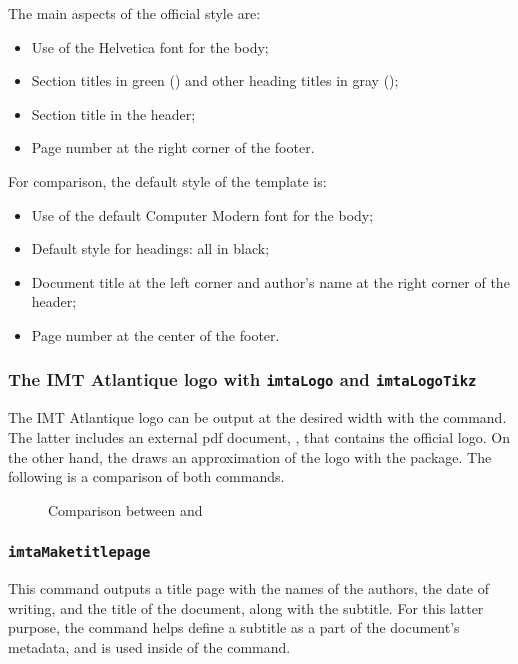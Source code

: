 \documentclass{article}
\begin{document}
The main aspects of the official style are:

\begin{itemize}
    \item Use of the Helvetica font for the body;
    \item Section titles in green () and other heading titles in gray ();
    \item Section title in the header;
    \item Page number at the right corner of the footer.
\end{itemize}

For comparison, the default style of the template is:

\begin{itemize}
    \item Use of the default Computer Modern font for the body;
    \item Default style for headings: all in black;
    \item Document title at the left corner and author's name at the right corner of the header;
    \item Page number at the center of the footer.
\end{itemize}

\subsubsection{The IMT Atlantique logo with \texttt{imtaLogo} and \texttt{imtaLogoTikz}}
The IMT Atlantique logo can be output at the desired width with the  command.
The latter includes an external pdf document, , that contains the official logo.
On the other hand, the  draws an approximation of the logo with the  package.
The following is a comparison of both commands.

\begin{figure}[H]
    \centering
    \imtaLogo{5cm}
    \imtaLogoTikz{5cm}
    \caption{Comparison between  and }
    \label{fig:imtaLogo}
\end{figure}


\subsubsection{\texttt{imtaMaketitlepage}}
This command outputs a title page with the names of the authors, the date of writing, and the title of the document, along with the subtitle.
For this latter purpose, the  command helps define a subtitle as a part of the document's metadata, and %
is used inside of the  command.
\end{document}
